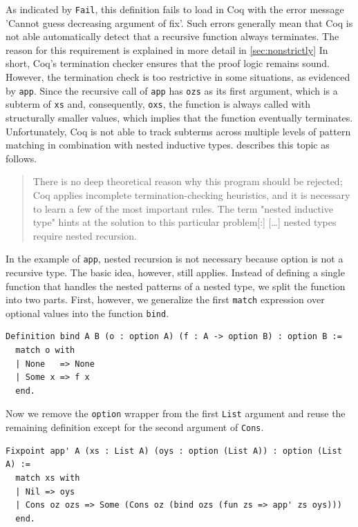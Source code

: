 \documentclass[a4paper, 11pt, fleqn, twoside]{scrreprt}
\newcommand{\cinl}[1]{\texttt{#1}}
\begin{document}
As indicated by \cinl{Fail}, this definition fails to load in Coq with the error message 'Cannot guess decreasing argument of fix'.
Such errors generally mean that Coq is not able automatically detect that a recursive function always terminates.
The reason for this requirement is explained in more detail in \autoref{sec:nonstrictly}
In short, Coq's termination checker ensures that the proof logic remains sound.
However, the termination check is too restrictive in some situations, as evidenced by \cinl{app}.
Since the recursive call of \cinl{app} has \cinl{ozs} as its first argument, which is a subterm of \cinl{xs} and, consequently, \cinl{oxs}, the function is always called with structurally smaller values, which implies that the function eventually terminates.
Unfortunately, Coq is not able to track subterms across multiple levels of pattern matching in combination with nested inductive types. \citet{chlipala2013certified} describes this topic as follows.

\begin{quotation}
\noindent
There is no deep theoretical reason why this program should be rejected; Coq applies incomplete termination-checking heuristics, and it is necessary to learn a few of the most important rules. The term "nested inductive type" hints at the solution to this particular problem[:] [\dots{}] nested types require nested recursion.
\end{quotation}

In the example of \cinl{app}, nested recursion is not necessary because option is not a recursive type.
The basic idea, however, still applies.
Instead of defining a single function that handles the nested patterns of a nested type, we split the function into two parts.
First, however, we generalize the first \cinl{match} expression over optional values into the function \cinl{bind}.

\begin{verbatim}
Definition bind A B (o : option A) (f : A -> option B) : option B :=
  match o with
  | None   => None
  | Some x => f x
  end.
\end{verbatim}

Now we remove the \cinl{option} wrapper from the first \cinl{List} argument and reuse the remaining definition except for the second argument of \cinl{Cons}.

\begin{verbatim}
Fixpoint app' A (xs : List A) (oys : option (List A)) : option (List A) :=
  match xs with
  | Nil => oys
  | Cons oz ozs => Some (Cons oz (bind ozs (fun zs => app' zs oys)))
  end.
\end{verbatim}
\end{document}
